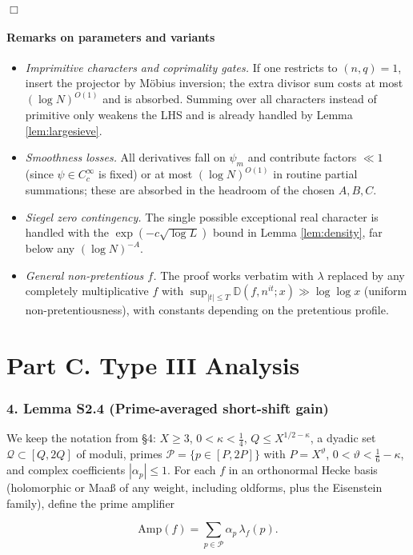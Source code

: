 \documentclass[11pt]{article}
\theoremstyle{definition}
\theoremstyle{remark}
\begin{document}
\hfill$\Box$

\subsection*{Remarks on parameters and variants}
\begin{itemize}[leftmargin=1.7em]
\item \emph{Imprimitive characters and coprimality gates.} If one restricts to $(n,q)=1$, insert the projector by Möbius inversion; the extra divisor sum costs at most $(\log N)^{O(1)}$ and is absorbed. Summing over all characters instead of primitive only weakens the LHS and is already handled by Lemma \ref{lem:largesieve}.
\item \emph{Smoothness losses.} All derivatives fall on $\psi_m$ and contribute factors $\ll 1$ (since $\psi\in C_c^\infty$ is fixed) or at most $(\log N)^{O(1)}$ in routine partial summations; these are absorbed in the headroom of the chosen $A,B,C$.
\item \emph{Siegel zero contingency.} The single possible exceptional real character is handled with the $\exp(-c\sqrt{\log L})$ bound in Lemma \ref{lem:density}, far below any $(\log N)^{-A}$.
\item \emph{General non-pretentious $f$.} The proof works verbatim with $\lambda$ replaced by any completely multiplicative $f$ with $\sup_{|t|\le T}\mathbb D(f,n^{it};x)\gg \log\log x$ (uniform non-pretentiousness), with constants depending on the pretentious profile.
\end{itemize}

\part*{Part C. Type III Analysis}

\section*{4. Lemma S2.4 (Prime-averaged short-shift gain)}
We keep the notation from §4: $X\ge 3$, $0<\kappa<\tfrac14$, $Q\le X^{1/2-\kappa}$, a dyadic set $\mathcal Q\subset[Q,2Q]$ of moduli, primes $\mathcal P=\{p\in[P,2P]\}$ with $P=X^\vartheta$, $0<\vartheta<\tfrac16-\kappa$, and complex coefficients $|\alpha_p|\le 1$. For each $f$ in an orthonormal Hecke basis (holomorphic or Maaß of any weight, including oldforms, plus the Eisenstein family), define the prime amplifier

$$
\mathrm{Amp}(f)=\sum_{p\in\mathcal P}\alpha_p\,\lambda_f(p).
$$
\end{document}
